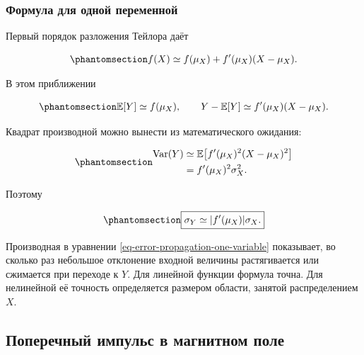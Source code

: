 \documentclass[
  russian,
  11pt,
  a4paper,
  open=any]{scrbook}
\begin{document}
\begin{bookderivation}

\subsubsection{Формула для одной
переменной}\label{ux444ux43eux440ux43cux443ux43bux430-ux434ux43bux44f-ux43eux434ux43dux43eux439-ux43fux435ux440ux435ux43cux435ux43dux43dux43eux439}

Первый порядок разложения Тейлора даёт

\begin{equation}\protect\phantomsection\label{eq-ch6-one-variable-taylor}{
f(X)\simeq
f(\mu_X)+f'(\mu_X)(X-\mu_X).
}\end{equation}

В этом приближении

\begin{equation}\protect\phantomsection\label{eq-ch6-one-variable-centered-output}{
\mathbb E[Y]\simeq f(\mu_X),
\qquad
Y-\mathbb E[Y]
\simeq f'(\mu_X)(X-\mu_X).
}\end{equation}

Квадрат производной можно вынести из математического ожидания:

\begin{equation}\protect\phantomsection\label{eq-ch6-one-variable-variance-derivation}{
\begin{aligned}
\operatorname{Var}(Y)
&\simeq
\mathbb E\!\left[
f'(\mu_X)^2(X-\mu_X)^2
\right]\\
&=f'(\mu_X)^2\sigma_X^2.
\end{aligned}
}\end{equation}

Поэтому

\begin{equation}\protect\phantomsection\label{eq-error-propagation-one-variable}{
\boxed{
\sigma_Y\simeq |f'(\mu_X)|\sigma_X.
}
}\end{equation}

\end{bookderivation}

Производная в уравнении \ref{eq-error-propagation-one-variable}
показывает, во сколько раз небольшое отклонение входной величины
растягивается или сжимается при переходе к \(Y\). Для линейной функции
формула точна. Для нелинейной её точность определяется размером области,
занятой распределением \(X\).

\subsection{Поперечный импульс в магнитном
поле}\label{ux43fux43eux43fux435ux440ux435ux447ux43dux44bux439-ux438ux43cux43fux443ux43bux44cux441-ux432-ux43cux430ux433ux43dux438ux442ux43dux43eux43c-ux43fux43eux43bux435}
\end{document}
